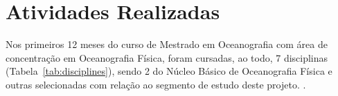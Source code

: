 \chapter{Atividades Realizadas}

\hspace{5mm} Nos primeiros 12 meses do curso de Mestrado em Oceanografia com área de concentração em Oceanografia Física, foram cursadas, ao todo, 7 disciplinas (Tabela~\ref{tab:disciplines}), sendo 2 do Núcleo Básico de Oceanografia Física e outras selecionadas com relação ao segmento de estudo deste projeto. .


